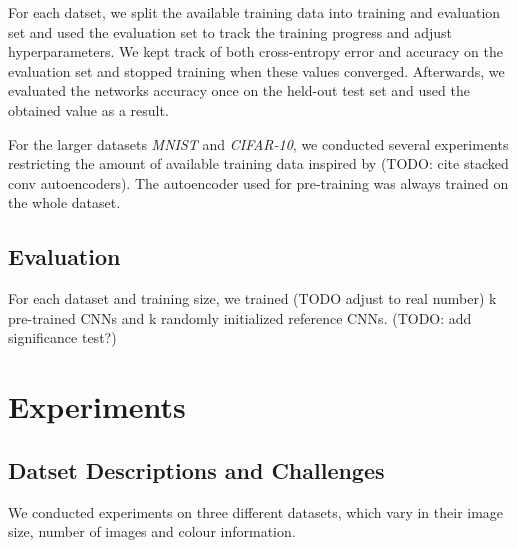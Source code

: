 \documentclass[draft]{article}
\begin{document}
    For each datset, we split the available training data into training and evaluation set and used the evaluation set to track the training progress and adjust hyperparameters. We kept track of both cross-entropy error and accuracy on the evaluation set and stopped training when these values converged. Afterwards, we evaluated the networks accuracy once on the held-out test set and used the obtained value as a result. 

    For the larger datasets \emph{MNIST} and \emph{CIFAR-10}, we conducted several experiments restricting the amount of available training data inspired by (TODO: cite stacked conv autoencoders). The autoencoder used for pre-training was always trained on the whole dataset. 


  \subsection{Evaluation}
    For each dataset and training size, we trained (TODO adjust to real number) k pre-trained CNNs and k randomly initialized reference CNNs. (TODO: add significance test?)
  

\section{Experiments}

  \subsection{Datset Descriptions and Challenges}
  We conducted experiments on three different datasets, which vary in their image size, number of images and colour information.
\end{document}
